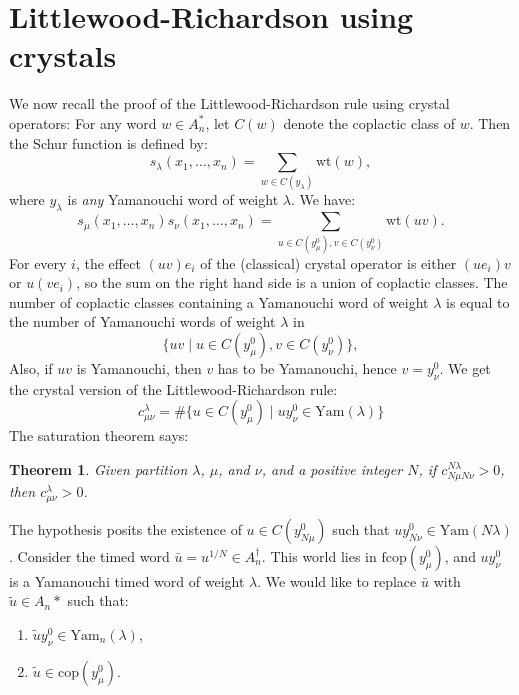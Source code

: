\documentclass[12pt]{amsproc}
\newcommand{\Yam}{\mathrm{Yam}}
\newcommand{\fcop}{\mathrm{fcop}}
\newcommand{\cop}{\mathrm{cop}}
\newcommand{\wt}{\mathrm{wt}}
\newtheorem{theorem}{Theorem}
\theoremstyle{definition}
\begin{document}
\section{Littlewood-Richardson using crystals}
We now recall the proof of the Littlewood-Richardson rule using crystal operators:
\label{sec:recoll-proof-littl}
For any word $w\in A_n^*$, let $C(w)$ denote the coplactic class of $w$.
Then the Schur function is defined by:
\begin{displaymath}
  s_\lambda(x_1,\dotsc,x_n) = \sum_{w\in C(y_\lambda)} \wt(w),
\end{displaymath}
where $y_\lambda$ is \emph{any} Yamanouchi word of weight $\lambda$.
We have:
\begin{displaymath}
  s_\mu(x_1,\dotsc,x_n)s_\nu(x_1,\dotsc,x_n)=\sum_{u\in C(y^0_\mu),v\in C(y^0_\nu)} \wt(uv).
\end{displaymath}
For every $i$, the effect $(uv)e_i$ of the (classical) crystal operator is either $(ue_i)v$ or $u(ve_i)$, so the sum on the right hand side is a union of coplactic classes.
The number of coplactic classes containing a Yamanouchi word of weight $\lambda$ is equal to the number of Yamanouchi words of weight $\lambda$ in
\begin{displaymath}
  \{uv\mid u\in C(y^0_\mu),v\in C(y^0_\nu)\},
\end{displaymath}
Also, if $uv$ is Yamanouchi, then $v$ has to be Yamanouchi, hence $v=y_\nu^0$.
We get the crystal version of the Littlewood-Richardson rule:
\begin{displaymath}
  c^\lambda_{\mu\nu} = \#\{u\in C(y^0_\mu)\mid uy^0_\nu\in \Yam(\lambda)\}
\end{displaymath}
The saturation theorem says:
\begin{theorem}
  Given partition $\lambda$, $\mu$, and $\nu$, and a positive integer $N$, if $c^{N\lambda}_{N\mu N\nu}>0$, then $c^\lambda_{\mu\nu}>0$.
\end{theorem}
The hypothesis posits the existence of $u\in C(y_{N\mu}^0)$ such that $uy_{N\nu}^0\in \Yam(N\lambda)$.
Consider the timed word $\bar u=u^{1/N}\in A_n^\dagger$.
This world lies in $\fcop(y_\mu^0)$, and $uy_\nu^0$ is a Yamanouchi timed word of weight $\lambda$.
We would like to replace $\bar u$ with $\tilde u\in A_n*$ such that:
\begin{enumerate}
\item $\tilde u y^0_\nu\in \Yam_n(\lambda)$,
\item $\tilde u\in \cop(y_\mu^0)$.
\end{enumerate}
\end{document}
